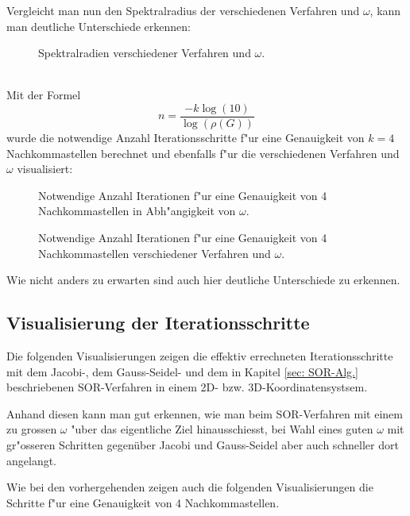 \begin{refsection}
Vergleicht man nun den Spektralradius der verschiedenen Verfahren und $\omega$, kann man deutliche Unterschiede erkennen:
\begin{figure}[!ht]\centering
\caption{Spektralradien verschiedener Verfahren und $\omega$.}
\label{fig:Spekt.rad. Diagr.}
\end{figure}\\

Mit der Formel 
\begin{equation} \label{eq: Accuracy}
n=\frac{-k \log{(10)}}{\log{(\rho(G))}}
\end{equation}
wurde die notwendige Anzahl Iterationsschritte f"ur eine Genauigkeit von
$k=4$ Nachkommastellen berechnet und ebenfalls f"ur die verschiedenen
Verfahren und $\omega$ visualisiert:
\begin{figure}[!ht]\centering
\caption{Notwendige Anzahl Iterationen f"ur  eine Genauigkeit von 4 Nachkommastellen in Abh"angigkeit von $\omega$.}
\label{fig:Spekt.rad.vs.Anz.It.}
\end{figure}
\begin{figure}[!ht]\centering
\caption{Notwendige Anzahl Iterationen f"ur  eine Genauigkeit von 4 Nachkommastellen verschiedener Verfahren und $\omega$.}
\label{fig:It.vs.omega}
\end{figure}

Wie nicht anders zu erwarten sind auch hier deutliche Unterschiede zu erkennen.
		
\subsection{Visualisierung der Iterationsschritte}
Die folgenden Visualisierungen zeigen die effektiv errechneten
Iterationsschritte mit dem Jacobi-, dem Gauss-Seidel- und dem in
Kapitel \ref{sec: SOR-Alg.} beschriebenen SOR-Verfahren in einem 2D-
bzw. 3D-Koordinatensystsem.

Anhand diesen kann man gut erkennen, wie man beim SOR-Verfahren mit
einem zu grossen $\omega$ "uber das eigentliche Ziel hinausschiesst,
bei Wahl eines guten $\omega$ mit gr"osseren Schritten gegenüber Jacobi
und Gauss-Seidel aber auch schneller dort angelangt.

Wie bei den vorhergehenden zeigen auch die folgenden Visualisierungen
die Schritte f"ur eine Genauigkeit von 4 Nachkommastellen.
			

\end{refsection}
